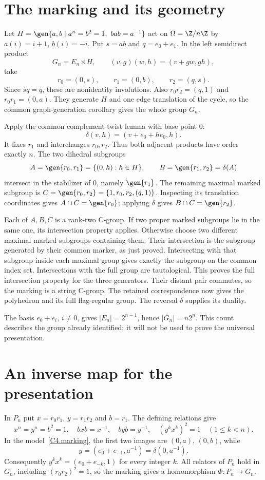 \section{The marking and its geometry}
Let $H=\gen{a,b\mid a^n=b^2=1,\ bab=a^{-1}}$ act on
$\Omega=\Z/n\Z$ by $a(i)=i+1$, $b(i)=-i$.
Put $s=ab$ and $q=e_0+e_1$. In the left semidirect product
\[
 G_n=E_n\rtimes H,\qquad (v,g)(w,h)=(v+gw,gh),
\]
take
\begin{equation}\label{C4.marking}
 r_0=(0,s),\qquad r_1=(0,b),\qquad r_2=(q,s).
\end{equation}
Since $sq=q$, these are nonidentity involutions. Also
$r_0r_2=(q,1)$ and $r_0r_1=(0,a)$.
They generate $H$ and one edge translation of the cycle, so the common
graph-generation corollary gives the whole group $G_n$.

Apply the common complement-twist lemma with base point $0$:
\[
 \delta(v,h)=(v+e_0+he_0,h).
\]
It fixes $r_1$ and interchanges $r_0,r_2$. Thus both adjacent products
have order exactly $n$. The two dihedral subgroups
\[
 A=\gen{r_0,r_1}=\{(0,h):h\in H\},\qquad
 B=\gen{r_1,r_2}=\delta(A)
\]
intersect in the stabilizer of $0$, namely $\gen{r_1}$.
The remaining maximal marked subgroup is
$C=\gen{r_0,r_2}=\{1,r_0,r_2,(q,1)\}$.
Inspecting its translation coordinates gives $A\cap C=\gen{r_0}$;
applying $\delta$ gives $B\cap C=\gen{r_2}$.

Each of $A,B,C$ is a rank-two C-group. If two proper marked subgroups
lie in the same one, its intersection property applies. Otherwise
choose two different maximal marked subgroups containing them.
Their intersection is the subgroup generated by their common marker,
as just proved. Intersecting with that subgroup inside each maximal
group gives exactly the subgroup on the common index set.
Intersections with the full group are tautological. This proves the
full intersection property for the three generators. Their distant
pair commutes, so the marking is a string C-group. The retained
correspondence now gives the polyhedron and its full flag-regular
group. The reversal $\delta$ supplies its duality.

The basis $e_0+e_i$, $i\ne0$, gives $|E_n|=2^{n-1}$, hence
$|G_n|=n2^n$. This count describes the group already identified;
it will not be used to prove the universal presentation.

\section{An inverse map for the presentation}
In $P_n$ put $x=r_0r_1$, $y=r_1r_2$ and $b=r_1$.
The defining relations give
\[
 x^n=y^n=b^2=1,\quad bxb=x^{-1},\quad byb=y^{-1},
 \quad(y^kx^k)^2=1\quad(1\le k<n).
\]
In the model~\eqref{C4.marking}, the first two images are $(0,a)$,
$(0,b)$, while
\[
 y=(e_0+e_{-1},a^{-1})=\delta(0,a^{-1}).
\]
Consequently $y^kx^k=(e_0+e_{-k},1)$ for every integer $k$.
All relators of $P_n$ hold in $G_n$, including $(r_0r_2)^2=1$,
so the marking gives a homomorphism $\Phi:P_n\to G_n$.

